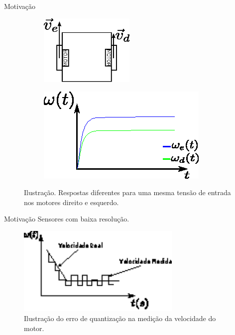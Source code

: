 \begin{frame}{Motivação}
    \begin{figure}[H]
        \begin{subfigure}{.5\textwidth}
        \centering
        \includegraphics[width=0.5\textwidth]{figuras/ilustracoes/ilustracao_robo_diferentes_velocidades.eps}
        \end{subfigure}
        \begin{subfigure}{.5\textwidth}
        \centering
        \includegraphics[width=\textwidth]{figuras/ilustracoes/ilustracao_caso_motivacional.eps}
        \end{subfigure}
        \caption{Ilustração. Respostas diferentes para uma mesma tensão de entrada nos motores direito e esquerdo.}
    \end{figure}
\end{frame}

\begin{frame}{Motivação}
Sensores com baixa resolução.
    \begin{figure}[H]
        \centering
        \includegraphics[width=0.7\textwidth]{figuras/ilustracoes/ilustracao_erro_de_quantizacao.eps}
        \caption{Ilustração do erro de quantização na medição da velocidade do motor.}
    \end{figure}
\end{frame}

